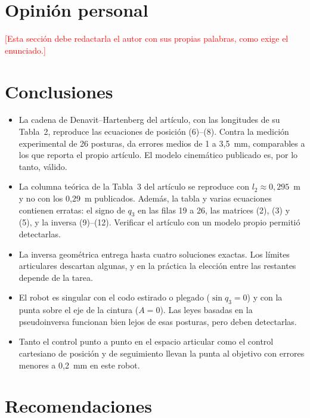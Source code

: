 \documentclass[11pt,a4paper]{article}
\newcommand{\pendiente}[1]{\textcolor{red}{[#1]}}
\begin{document}
\section{Opinión personal}

\pendiente{Esta sección debe redactarla el autor con sus propias palabras, como exige el enunciado.}

\section{Conclusiones}

\begin{itemize}
\item La cadena de Denavit--Hartenberg del artículo, con las longitudes de su Tabla~2, reproduce las ecuaciones de posición (6)--(8). Contra la medición experimental de 26 posturas, da errores medios de 1 a 3,5~mm, comparables a los que reporta el propio artículo. El modelo cinemático publicado es, por lo tanto, válido.
\item La columna teórica de la Tabla~3 del artículo se reproduce con \(l_2\approx 0{,}295\)~m y no con los 0,29~m publicados. Además, la tabla y varias ecuaciones contienen erratas: el signo de \(q_3\) en las filas 19 a 26, las matrices (2), (3) y (5), y la inversa (9)--(12). Verificar el artículo con un modelo propio permitió detectarlas.
\item La inversa geométrica entrega hasta cuatro soluciones exactas. Los límites articulares descartan algunas, y en la práctica la elección entre las restantes depende de la tarea.
\item El robot es singular con el codo estirado o plegado (\(\sin q_3=0\)) y con la punta sobre el eje de la cintura (\(A=0\)). Las leyes basadas en la pseudoinversa funcionan bien lejos de esas posturas, pero deben detectarlas.
\item Tanto el control punto a punto en el espacio articular como el control cartesiano de posición y de seguimiento llevan la punta al objetivo con errores menores a 0,2~mm en este robot.
\end{itemize}

\section{Recomendaciones}
\end{document}
